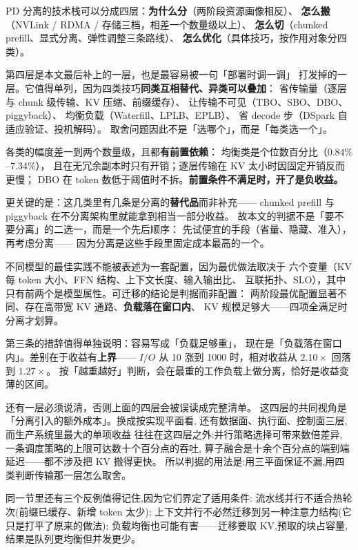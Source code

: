 PD 分离的技术栈可以分成四层：\textbf{为什么分}（两阶段资源画像相反）、
\textbf{怎么搬}（NVLink / RDMA / 存储三档，相差一个数量级以上）、
\textbf{怎么切}（chunked prefill、显式分离、弹性调整三条路线）、
\textbf{怎么优化}（具体技巧，按作用对象分四类）。

第四层是本文最后补上的一层，也是最容易被一句「部署时调一调」
打发掉的一层。它值得单列，因为四类技巧\textbf{同类互相替代、异类可以叠加}：
省传输量（逐层与 chunk 级传输、KV 压缩、前缀缓存）、
让传输不可见（TBO、SBO、DBO、piggyback）、
均衡负载（Waterfill、LPLB、EPLB）、
省 decode 步（DSpark 自适应验证、投机解码）。
取舍问题因此不是「选哪个」，而是「每类选一个」。

各类的幅度差一到两个数量级，且都\textbf{有前置依赖}：
均衡类是个位数百分比（$0.84\%$--$7.34\%$），
且在无冗余副本时只有开销；逐层传输在 KV 太小时因固定开销反而更慢；
DBO 在 token 数低于阈值时不拆。\textbf{前置条件不满足时，开了是负收益。}

更关键的是：这几类里有几条是分离的\textbf{替代品}而非补充——
chunked prefill 与 piggyback 在不分离架构里就能拿到相当一部分收益。
故本文的判据不是「要不要分离」的二选一，而是一个先后顺序：
先试便宜的手段（省量、隐藏、准入），再考虑分离——
因为分离是这些手段里固定成本最高的一个。

不同模型的最佳实践不能被表述为一套配置，因为最优做法取决于
六个变量（KV 每 token 大小、FFN 结构、上下文长度、输入输出比、
互联拓扑、SLO），其中只有前两个是模型属性。可迁移的结论是判据而非配置：
两阶段最优配置显著不同、存在高带宽 KV 通路、\textbf{负载落在窗口内}、
KV 规模足够大——四项全满足时分离才划算。

第三条的措辞值得单独说明：容易写成「负载足够重」，
现在是「负载落在窗口内」。差别在于收益有\textbf{上界}——
$I/O$ 从 10 涨到 1000 时，相对收益从 $2.10\times$ 回落到 $1.27\times$。
按「越重越好」判断，会在最重的工作负载上做分离，恰好是收益变薄的区间。


还有一层必须说清，否则上面的四层会被误读成完整清单。
这四层的共同视角是「分离引入的额外成本」。换成按实现平面看,
还有数据面、执行面、控制面三层,而生产系统里最大的单项收益
往往在这四层之外:并行策略选择可带来数倍差异,
一条调度策略的上限可达数十个百分点的吞吐,
算子融合是十余个百分点的端到端延迟——都不涉及把 KV 搬得更快。
所以判据的用法是:用三平面保证不漏,用四类判断传输那一层怎么取舍。

同一节里还有三个反例值得记住,因为它们界定了适用条件:
流水线并行不适合热轮次(前缀已缓存、新增 token 太少);
上下文并行不必然迁移到另一种注意力结构(它只是打平了原来的做法);
负载均衡也可能有害——迁移要取 KV,预取的块占容量,
结果是队列更均衡但并发更少。

